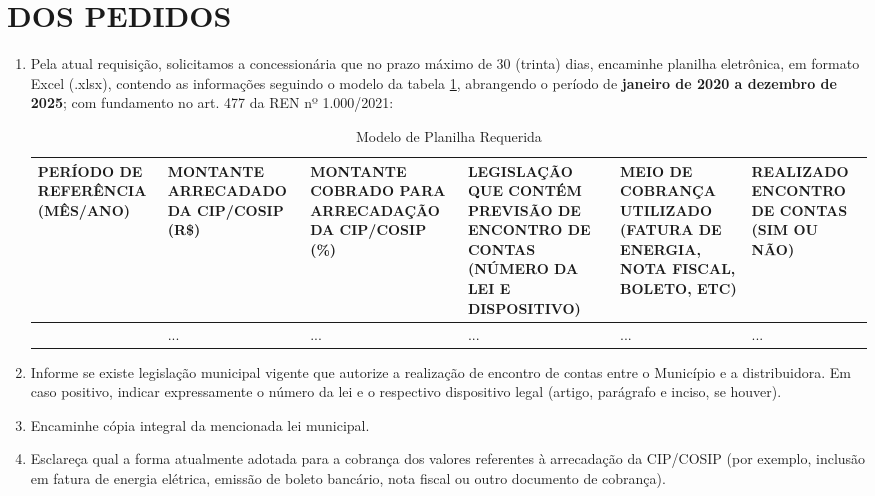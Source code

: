  
\usepackage{tabularx}
\usepackage{array}
\renewcommand{\tabularxcolumn}[1]{m{#1}}


\newcommand{\Peticao}{PETIÇÃO DE DOCUMENTOS E INFORMAÇÕES}
\newcommand{\NumeroDoc}{008}









\section{DOS PEDIDOS}

\begin{enumerate}[resume]
  \item Pela atual requisição, solicitamos a concessionária que no prazo máximo de 30 (trinta) dias, encaminhe planilha eletrônica, em formato Excel (.xlsx), contendo as informações seguindo o modelo da tabela \ref{modelo-planilha}, abrangendo o período de \textbf{janeiro de 2020 a dezembro de 2025}; com fundamento no art. 477 da REN nº 1.000/2021:

\begin{table}[ht]
  \caption{Modelo de Planilha Requerida}
\fontsize{7}{12}\selectfont
\begin{tabularx}{\textwidth}{|>{\centering\arraybackslash}X|>{\centering\arraybackslash}X|>{\centering\arraybackslash}X|>{\centering\arraybackslash}X|>{\centering\arraybackslash}X|>{\centering\arraybackslash}X|}
\hline
PERÍODO DE REFERÊNCIA (MÊS/ANO) &
  MONTANTE ARRECADADO DA CIP/COSIP (R\$) &
  MONTANTE COBRADO PARA ARRECADAÇÃO DA CIP/COSIP (\%) &
  LEGISLAÇÃO QUE CONTÉM PREVISÃO DE ENCONTRO DE CONTAS (NÚMERO DA LEI E DISPOSITIVO) &
  MEIO DE COBRANÇA UTILIZADO (FATURA DE ENERGIA, NOTA FISCAL, BOLETO, ETC) &
  REALIZADO ENCONTRO DE CONTAS (SIM OU NÃO) \\ \hline
 &
   ... &
   ... &
   ... &
   ... &
   ... \\ \hline
\end{tabularx}
  \label{modelo-planilha}
\end{table}

  \item Informe se existe legislação municipal vigente que autorize a realização de encontro de contas entre o Município e a distribuidora. Em caso positivo, indicar expressamente o número da lei e o respectivo dispositivo legal (artigo, parágrafo e inciso, se houver).
  \item Encaminhe cópia integral da mencionada lei municipal.
  \item Esclareça qual a forma atualmente adotada para a cobrança dos valores referentes à arrecadação da CIP/COSIP (por exemplo, inclusão em fatura de energia elétrica, emissão de boleto bancário, nota fiscal ou outro documento de cobrança).
\end{enumerate}





